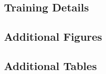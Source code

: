 \documentclass[12pt,letterpaper]{article}
\begin{document}




\clearpage
\makeappendix

\subsection{Training Details}

\subsection{Additional Figures}

\subsection{Additional Tables}
\end{document}
